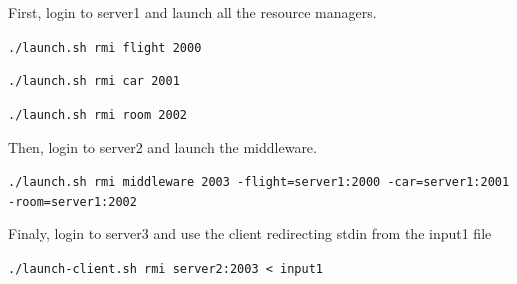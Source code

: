 \documentclass[a4paper]{article}
\begin{document}
First, login to server1 and launch all the resource managers.

{\tt ./launch.sh rmi flight 2000}

{\tt ./launch.sh rmi car 2001}

{\tt ./launch.sh rmi room 2002}

Then, login to server2 and launch the middleware.

{\tt ./launch.sh rmi middleware 2003 -flight=server1:2000 -car=server1:2001 -room=server1:2002}

Finaly, login to server3 and use the client redirecting stdin from the input1 file
 
{\tt ./launch-client.sh rmi server2:2003 < input1}



%
%
\end{document}
